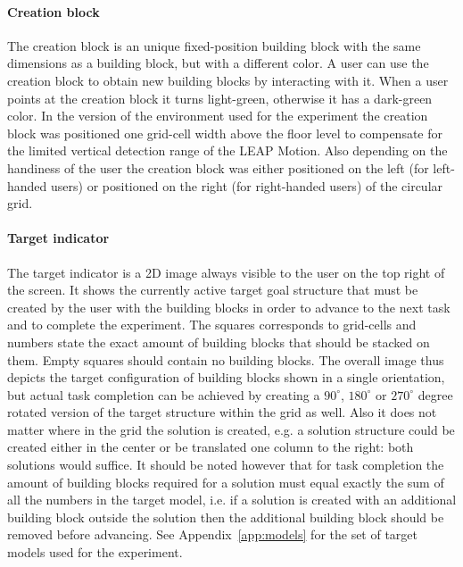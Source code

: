 \paragraph{Creation block}
The creation block is an unique fixed-position building block with the same dimensions as a building block, but with a different color. A user can use the creation block to obtain new building blocks by interacting with it. When a user points at the creation block it turns light-green, otherwise it has a dark-green color. In the version of the environment used for the experiment the creation block was positioned one grid-cell width above the floor level to compensate for the limited vertical detection range of the LEAP Motion. Also depending on the handiness of the user the creation block was either positioned on the left (for left-handed users) or positioned on the right (for right-handed users) of the circular grid.

\paragraph{Target indicator}
The target indicator is a 2D image always visible to the user on the top right of the screen. It shows the currently active target goal structure that must be created by the user with the building blocks in order to advance to the next task and to complete the experiment. The squares corresponds to grid-cells and numbers state the exact amount of building blocks that should be stacked on them. Empty squares should contain no building blocks. The overall image thus depicts the target configuration of building blocks shown in a single orientation, but actual task completion can be achieved by creating a $90^{\circ}$, $180^{\circ}$ or $270^{\circ}$ degree rotated version of the target structure within the grid as well. Also it does not matter where in the grid the solution is created, e.g. a solution structure could be created either in the center or be translated one column to the right: both solutions would suffice. It should be noted however that for task completion the amount of building blocks required for a solution must equal exactly the sum of all the numbers in the target model, i.e. if a solution is created with an additional building block outside the solution then the additional building block should be removed before advancing. See Appendix~\ref{app:models} for the set of target models used for the experiment.


